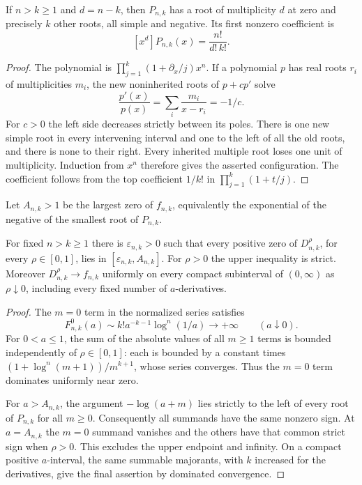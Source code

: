\begin{lemma}\label{cont26:lem:bif-elementary-roots}
If $n>k\geq1$ and $d=n-k$, then $P_{n,k}$ has a root of multiplicity
$d$ at zero and precisely $k$ other roots, all simple and negative.
Its first nonzero coefficient is
\[
 [x^d]P_{n,k}(x)=\frac{n!}{d!\,k!}.
\]
\end{lemma}
\begin{proof}
The polynomial is $\prod_{j=1}^k(1+\partial_x/j)x^n$. If a polynomial
$p$ has real roots $r_i$ of multiplicities $m_i$, the new noninherited
roots of $p+c p'$ solve
\[
 \frac{p'(x)}{p(x)}=\sum_i\frac{m_i}{x-r_i}=-1/c.
\]
For $c>0$ the left side decreases strictly between its poles. There is
one new simple root in every intervening interval and one to the left
of all the old roots, and there is none to their right. Every inherited
multiple root loses one unit of multiplicity. Induction from $x^n$
therefore gives the asserted configuration. The coefficient follows
from the top coefficient $1/k!$ in $\prod_{j=1}^k(1+t/j)$.
\end{proof}

Let $A_{n,k}>1$ be the largest zero of $f_{n,k}$, equivalently the
exponential of the negative of the smallest root of $P_{n,k}$.

\begin{lemma}\label{cont26:lem:bif-no-escape}
For fixed $n>k\geq1$ there is $\varepsilon_{n,k}>0$ such that every
positive zero of $D_{n,k}^{\rho}$, for every $\rho\in[0,1]$, lies in
$[\varepsilon_{n,k},A_{n,k}]$. For $\rho>0$ the upper inequality is strict.
Moreover $D_{n,k}^{\rho}\to f_{n,k}$ uniformly on every compact
subinterval of $(0,\infty)$ as $\rho\downarrow0$, including every fixed
number of $a$-derivatives.
\end{lemma}
\begin{proof}
The $m=0$ term in the normalized series satisfies
\[
 F_{n,k}^{0}(a)\sim k!a^{-k-1}\log^n(1/a)\longrightarrow+\infty
 \qquad(a\downarrow0).
\]
For $0<a\leq1$, the sum of the absolute values of all $m\geq1$ terms is
bounded independently of $\rho\in[0,1]$: each is bounded by a constant
times $(1+\log^n(m+1))/m^{k+1}$, whose series converges.
Thus the $m=0$ term dominates uniformly near zero.

For $a>A_{n,k}$, the argument $-\log(a+m)$ lies strictly to the left
of every root of $P_{n,k}$ for all $m\geq0$. Consequently all summands
have the same nonzero sign. At $a=A_{n,k}$ the $m=0$ summand vanishes
and the others have that common strict sign when $\rho>0$. This excludes
the upper endpoint and infinity. On a compact positive $a$-interval,
the same summable majorants, with $k$ increased for the derivatives,
give the final assertion by dominated convergence.
\end{proof}

